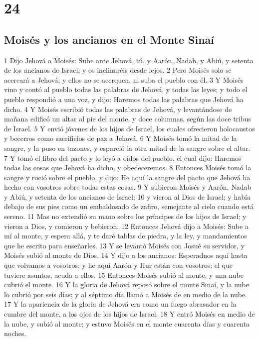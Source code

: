 \chapter{24}

\section{Moisés y los ancianos en el Monte Sinaí}

1 Dijo Jehová a Moisés: Sube ante Jehová, tú, y Aarón, Nadab, y Abiú, y setenta de los ancianos de Israel; y os inclinaréis desde lejos.
2 Pero Moisés solo se acercará a Jehová; y ellos no se acerquen, ni suba el pueblo con él.
3 Y Moisés vino y contó al pueblo todas las palabras de Jehová, y todas las leyes; y todo el pueblo respondió a una voz, y dijo: Haremos todas las palabras que Jehová ha dicho.
4 Y Moisés escribió todas las palabras de Jehová, y levantándose de mañana edificó un altar al pie del monte, y doce columnas, según las doce tribus de Israel.
5 Y envió jóvenes de los hijos de Israel, los cuales ofrecieron holocaustos y becerros como sacrificios de paz a Jehová.
6 Y Moisés tomó la mitad de la sangre, y la puso en tazones, y esparció la otra mitad de la sangre sobre el altar.
7 Y tomó el libro del pacto y lo leyó a oídos del pueblo, el cual dijo: Haremos todas las cosas que Jehová ha dicho, y obedeceremos.
8 Entonces Moisés tomó la sangre y roció sobre el pueblo, y dijo: He aquí la sangre del pacto que Jehová ha hecho con vosotros sobre todas estas cosas.
9 Y subieron Moisés y Aarón, Nadab y Abiú, y setenta de los ancianos de Israel;
10 y vieron al Dios de Israel; y había debajo de sus pies como un embaldosado de zafiro, semejante al cielo cuando está sereno.
11 Mas no extendió su mano sobre los príncipes de los hijos de Israel; y vieron a Dios, y comieron y bebieron.
12 Entonces Jehová dijo a Moisés: Sube a mí al monte, y espera allá, y te daré tablas de piedra, y la ley, y mandamientos que he escrito para enseñarles.
13 Y se levantó Moisés con Josué su servidor, y Moisés subió al monte de Dios.
14 Y dijo a los ancianos: Esperadnos aquí hasta que volvamos a vosotros; y he aquí Aarón y Hur están con vosotros; el que tuviere asuntos, acuda a ellos.
15 Entonces Moisés subió al monte, y una nube cubrió el monte.
16 Y la gloria de Jehová reposó sobre el monte Sinaí, y la nube lo cubrió por seis días; y al séptimo día llamó a Moisés de en medio de la nube.
17 Y la apariencia de la gloria de Jehová era como un fuego abrasador en la cumbre del monte, a los ojos de los hijos de Israel.
18 Y entró Moisés en medio de la nube, y subió al monte; y estuvo Moisés en el monte cuarenta días y cuarenta noches.

